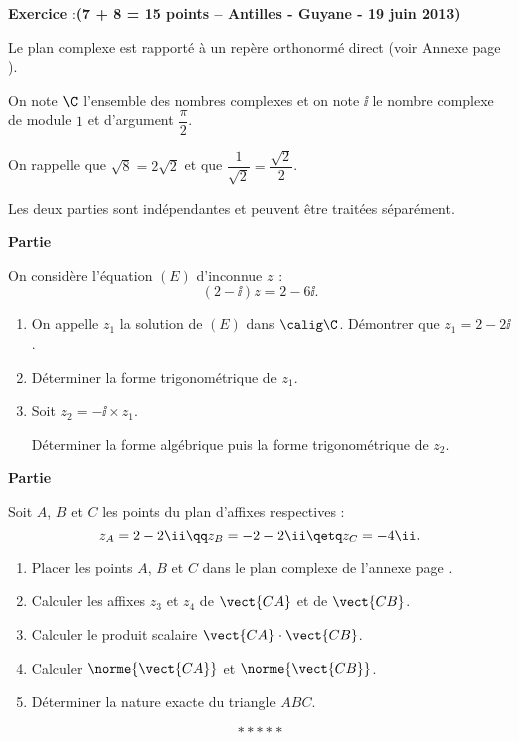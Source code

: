 \documentclass[12pt,french]{article}
\newcounter{exoc}
\newenvironment{exoc}[1]{%
  \refstepcounter{exoc}\textbf{Exercice \theexoc} :\hfill {\footnotesize\textbf{(#1)}}\par
  \medskip}%
{\medskip}
\begin{document}

\begin{exoc}{7 + 8 = 15 points -- Antilles - Guyane - 19 juin 2013}
    Le plan complexe est rapporté à un repère orthonormé direct \Ouv (voir Annexe page \pageref{Annexe}).\par
    On note $\C$ l'ensemble des nombres complexes et on note $\ii$ le nombre complexe de module $1$ et d'argument $\dfrac \pi 2$.\par
    On rappelle que $\sqrt 8 = 2\sqrt 2$ et que $\dfrac{1}{\sqrt 2} = \dfrac{\sqrt 2}{2}$.\medskip

Les deux parties sont indépendantes et peuvent être traitées séparément.\medskip

\textbf{Partie} \medskip

    On considère l'équation $(E)$ d'inconnue $z$ : \[(2 - \ii)z = 2 - 6\ii.\]
        \begin{enumerate}
            \item On appelle $z_1$ la solution de $(E)$ dans $\calig \C$. Démontrer que $z_1 = 2 - 2\ii$.
            \item Déterminer la forme trigonométrique de $z_1$.
            \item Soit $z_2 = -\ii \times z_1$.\par
            Déterminer la forme algébrique puis la forme trigonométrique de $z_2$.
        \end{enumerate}\medskip

\textbf{Partie} \medskip

    Soit $A$, $B$ et $C$ les points du plan d'affixes respectives :
        \[z_A = 2 -2 \ii \qq z_B = -2 - 2\ii \qetq z_C = -4\ii.\]
            \begin{enumerate}
                \item Placer les points $A$, $B$ et $C$ dans le plan complexe de l'annexe page \pageref{Annexe}.
                \item Calculer les affixes $z_3$ et $z_4$ de $\vect{CA}$ et de $\vect{CB}$.
                \item Calculer le produit scalaire $\vect{CA}\cdot\vect{CB}$.
                \item Calculer $\norme{\vect{CA}}$ et $\norme{\vect{CB}}$.
                \item Déterminer la nature exacte du triangle $ABC$.
            \end{enumerate}
\end{exoc}\[*****\]
\end{document}
